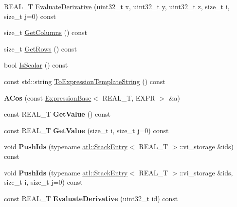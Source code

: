 \begin{DoxyCompactItemize}
R\+E\+A\+L\+\_\+\+T \hyperlink{structatl_1_1_a_cos_aa454c4122ad33d32b098af408c51df21}{Evaluate\+Derivative} (uint32\+\_\+t x, uint32\+\_\+t y, uint32\+\_\+t z, size\+\_\+t i, size\+\_\+t j=0) const 
\item 
size\+\_\+t \hyperlink{structatl_1_1_a_cos_ae0af289491d112c68be1bd9d9e8f49fc}{Get\+Columns} () const 
\item 
size\+\_\+t \hyperlink{structatl_1_1_a_cos_a05cf14fff32555d4465cfff8fd103fa0}{Get\+Rows} () const 
\item 
bool \hyperlink{structatl_1_1_a_cos_a842f9d51e6afdba5c00fadfade2d2c69}{Is\+Scalar} () const 
\item 
const std\+::string \hyperlink{structatl_1_1_a_cos_a925347a32bc88e5167b911bdfe3459e9}{To\+Expression\+Template\+String} () const 
\item 
\hypertarget{structatl_1_1_a_cos_a574a9a5304ad7c90f7d2add7308a9510}{{\bfseries A\+Cos} (const \hyperlink{structatl_1_1_expression_base}{Expression\+Base}$<$ R\+E\+A\+L\+\_\+\+T, E\+X\+P\+R $>$ \&a)}\label{structatl_1_1_a_cos_a574a9a5304ad7c90f7d2add7308a9510}

\item 
\hypertarget{structatl_1_1_a_cos_ac88f1dd97b4cbccd7c40fb64efc57d3f}{const R\+E\+A\+L\+\_\+\+T {\bfseries Get\+Value} () const }\label{structatl_1_1_a_cos_ac88f1dd97b4cbccd7c40fb64efc57d3f}

\item 
\hypertarget{structatl_1_1_a_cos_a444e9df0f5b21063bd332da73de6f23e}{const R\+E\+A\+L\+\_\+\+T {\bfseries Get\+Value} (size\+\_\+t i, size\+\_\+t j=0) const }\label{structatl_1_1_a_cos_a444e9df0f5b21063bd332da73de6f23e}

\item 
\hypertarget{structatl_1_1_a_cos_a7c76416ec36329542e9fa9c8e61648c6}{void {\bfseries Push\+Ids} (typename \hyperlink{structatl_1_1_stack_entry}{atl\+::\+Stack\+Entry}$<$ R\+E\+A\+L\+\_\+\+T $>$\+::vi\+\_\+storage \&ids) const }\label{structatl_1_1_a_cos_a7c76416ec36329542e9fa9c8e61648c6}

\item 
\hypertarget{structatl_1_1_a_cos_a5b882d4d0b3c5cd7195edc560cea5072}{void {\bfseries Push\+Ids} (typename \hyperlink{structatl_1_1_stack_entry}{atl\+::\+Stack\+Entry}$<$ R\+E\+A\+L\+\_\+\+T $>$\+::vi\+\_\+storage \&ids, size\+\_\+t i, size\+\_\+t j=0) const }\label{structatl_1_1_a_cos_a5b882d4d0b3c5cd7195edc560cea5072}

\item 
\hypertarget{structatl_1_1_a_cos_ab0fc53c07b3cd29337759805c61a33b4}{const R\+E\+A\+L\+\_\+\+T {\bfseries Evaluate\+Derivative} (uint32\+\_\+t id) const }\label{structatl_1_1_a_cos_ab0fc53c07b3cd29337759805c61a33b4}


\end{DoxyCompactItemize}
